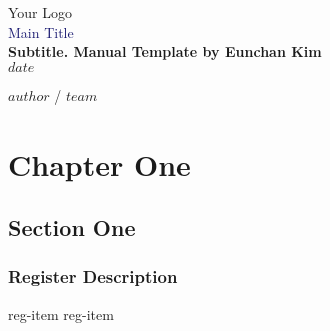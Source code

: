 \documentclass[10pt,letterpaper]{extbook}
\renewcommand{\maketitle}{\begin{titlepage} %
    \thispagestyle{empty}
    \raggedleft %
    \vspace*{\baselineskip} %
    
    {\Large Your Logo }\\[0.167\textheight] %

    {\textcolor{midnightblue}{\Huge Main Title}}\\[\baselineskip]

    {\LARGE\bfseries Subtitle. Manual Template by Eunchan Kim}\\[\baselineskip]

    {\Large \textit{$date$}}\par

    \vfill

    {\large $author$ / $team$}\par

    \vspace*{3\baselineskip}
    \pagebreak
    \end{titlepage}
    }
\begin{document}
\maketitle


\chapter{Chapter One}
\section{Section One}
\subsection{Register Description}
{reg-item}
\pagebreak
{reg-item}
\end{document}
